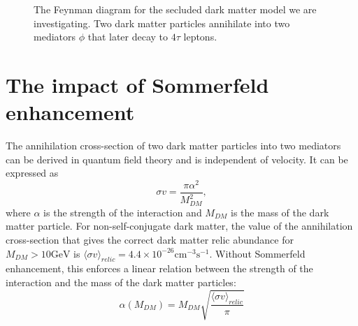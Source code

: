 \begin{figure}[htbp]
	\centering
	\caption{The Feynman diagram for the secluded dark matter model we are investigating. Two dark matter particles annihilate into two mediators \(\phi \) that later decay to \(4\tau \) leptons.}
	\label{fig:feynman}
\end{figure}

\section{The impact of Sommerfeld enhancement}
The annihilation cross-section of two dark matter particles into two mediators can be derived in quantum field theory and is independent of velocity. It can be expressed as
\begin{equation}
	\sigma v = \frac{\pi \alpha^2}{M_{DM}^2},
\end{equation}
where \(\alpha\) is the strength of the interaction and \(M_{DM} \) is the mass of the dark matter particle. For non-self-conjugate dark matter, the value of the annihilation cross-section that gives the correct dark matter relic abundance for \(M_{DM} > 10 \mathrm{GeV} \) is \(\langle \sigma v \rangle _{relic}  = 4.4 \times 10^{-26} \mathrm{cm^{-3} s^{-1}}\). Without Sommerfeld enhancement, this enforces a linear relation between the strength of the interaction and the mass of the dark matter particles:
\begin{equation}
	\alpha(M_{DM} ) = M_{DM} \sqrt{\frac{\langle \sigma v \rangle _{relic}}{\pi}}
\end{equation}

